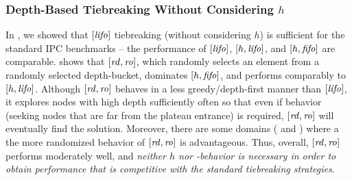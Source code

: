 
\subsubsection{Depth-Based Tiebreaking Without Considering $h$}

In , we showed that $[{\mbox{\textit{lifo}}}]$ tiebreaking (without considering $h$) is
sufficient for the standard IPC benchmarks -- the performance of $[{\mbox{\textit{lifo}}}]$, $[h,{\mbox{\textit{lifo}}}]$, and $[h,{\mbox{\textit{fifo}}}]$ are comparable.
 shows that $[{\mbox{\textit{rd}}},{\mbox{\textit{ro}}}]$, which randomly selects an element from a randomly selected depth-bucket, dominates $[h,{\mbox{\textit{fifo}}}]$,
and performs comparably to $[h,{\mbox{\textit{lifo}}}]$.
Although $[{\mbox{\textit{rd}}},{\mbox{\textit{ro}}}]$ behaves in a less greedy/depth-first manner than $[{\mbox{\textit{lifo}}}]$, 
it explores nodes with high depth sufficiently often so that even if \lifo behavior (seeking nodes that are far from the plateau entrance) is required, $[{\mbox{\textit{rd}}},{\mbox{\textit{ro}}}]$ will eventually find the solution.
Moreover, there are some domains ( and ) where a the more randomized behavior of $[{\mbox{\textit{rd}}},{\mbox{\textit{ro}}}]$ is advantageous.
Thus, overall, $[{\mbox{\textit{rd}}},{\mbox{\textit{ro}}}]$ performs moderately well, and 
\emph{neither $h$ nor \lifo-behavior is necessary in order to obtain performance that is competitive with the standard
tiebreaking strategies}.



